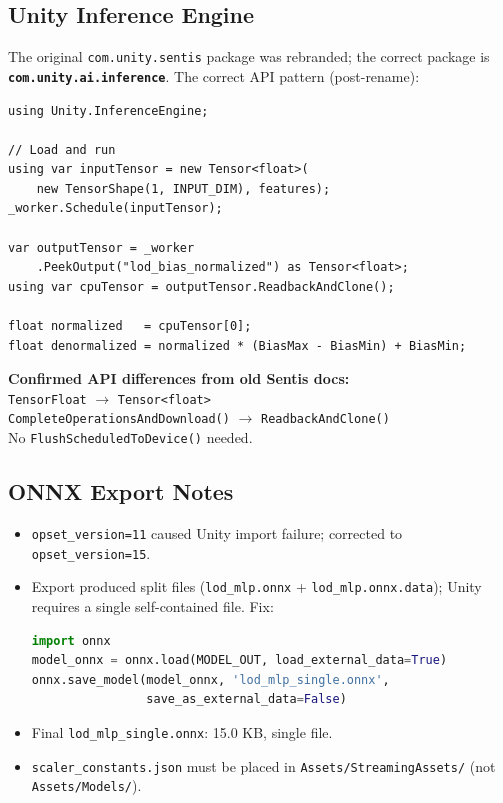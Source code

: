 \documentclass[12pt, a4paper]{article}
\begin{document}
\subsection{Unity Inference Engine}

The original \texttt{com.unity.sentis} package was rebranded;
the correct package is \textbf{\texttt{com.unity.ai.inference}}.
The correct API pattern (post-rename):

\begin{lstlisting}[language={[Sharp]C}, caption=Correct Unity Inference Engine API pattern]
using Unity.InferenceEngine;

// Load and run
using var inputTensor = new Tensor<float>(
    new TensorShape(1, INPUT_DIM), features);
_worker.Schedule(inputTensor);

var outputTensor = _worker
    .PeekOutput("lod_bias_normalized") as Tensor<float>;
using var cpuTensor = outputTensor.ReadbackAndClone();

float normalized   = cpuTensor[0];
float denormalized = normalized * (BiasMax - BiasMin) + BiasMin;
\end{lstlisting}

\begin{warningbox}
\textbf{Confirmed API differences from old Sentis docs:}\\
\texttt{TensorFloat} $\to$ \texttt{Tensor<float>}\\
\texttt{CompleteOperationsAndDownload()} $\to$ \texttt{ReadbackAndClone()}\\
No \texttt{FlushScheduledToDevice()} needed.
\end{warningbox}

\subsection{ONNX Export Notes}

\begin{itemize}
  \item \texttt{opset\_version=11} caused Unity import failure; corrected to
    \texttt{opset\_version=15}.
  \item Export produced split files (\texttt{lod\_mlp.onnx} +
    \texttt{lod\_mlp.onnx.data}); Unity requires a single self-contained file.
    Fix:
\begin{lstlisting}[language=Python]
import onnx
model_onnx = onnx.load(MODEL_OUT, load_external_data=True)
onnx.save_model(model_onnx, 'lod_mlp_single.onnx',
                save_as_external_data=False)
\end{lstlisting}
  \item Final \texttt{lod\_mlp\_single.onnx}: 15.0 KB, single file.
  \item \texttt{scaler\_constants.json} must be placed in
    \texttt{Assets/StreamingAssets/} (not \texttt{Assets/Models/}).
\end{itemize}
\end{document}

